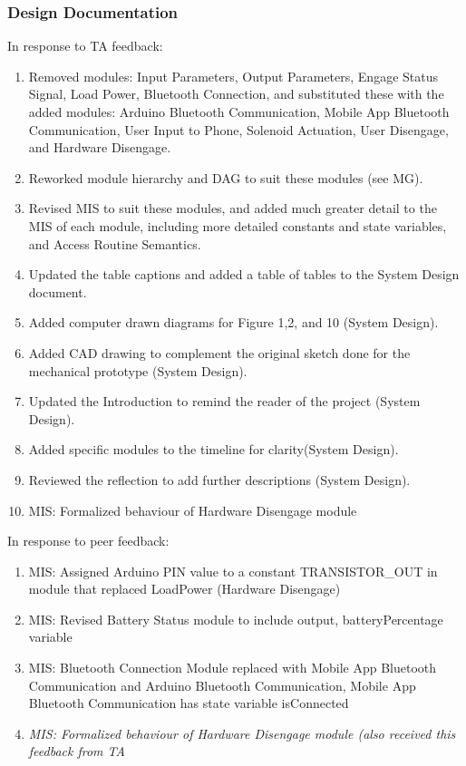 \documentclass{article}
\begin{document}
\subsubsection{Design Documentation}
In response to TA feedback:
\begin{enumerate}
    \item Removed modules: Input Parameters, Output Parameters, Engage Status Signal, Load Power, Bluetooth Connection, and substituted these with the added modules: Arduino Bluetooth Communication, Mobile App Bluetooth Communication, User Input to Phone, Solenoid Actuation, User Disengage, and Hardware Disengage.
    \item Reworked module hierarchy and DAG to suit these modules (see MG).
    \item Revised MIS to suit these modules, and added much greater detail to the MIS of each module, including more detailed constants and state variables, and Access Routine Semantics.
    \item Updated the table captions and added a table of tables to the System Design document. 
    \item Added computer drawn diagrams for Figure 1,2, and 10 (System Design).
    \item Added CAD drawing to complement the original sketch done for the mechanical prototype (System Design).
    \item Updated the Introduction to remind the reader of the project (System Design).
     \item Added specific modules to the timeline for clarity(System Design).
     \item Reviewed the reflection to add further descriptions (System Design).
   \item MIS: Formalized behaviour of Hardware Disengage module
\end{enumerate}

\noindent In response to peer feedback:
\begin{enumerate}
    \item MIS: Assigned Arduino PIN value to a constant TRANSISTOR\_OUT in module that replaced LoadPower (Hardware Disengage)
    \item MIS: Revised Battery Status module to include output, batteryPercentage variable
    \item MIS: Bluetooth Connection Module replaced with Mobile App Bluetooth Communication and Arduino Bluetooth Communication, Mobile App Bluetooth Communication has state variable isConnected
\item \textit{MIS: Formalized behaviour of Hardware Disengage module (also received this feedback from TA}
\end{enumerate}
\end{document}
